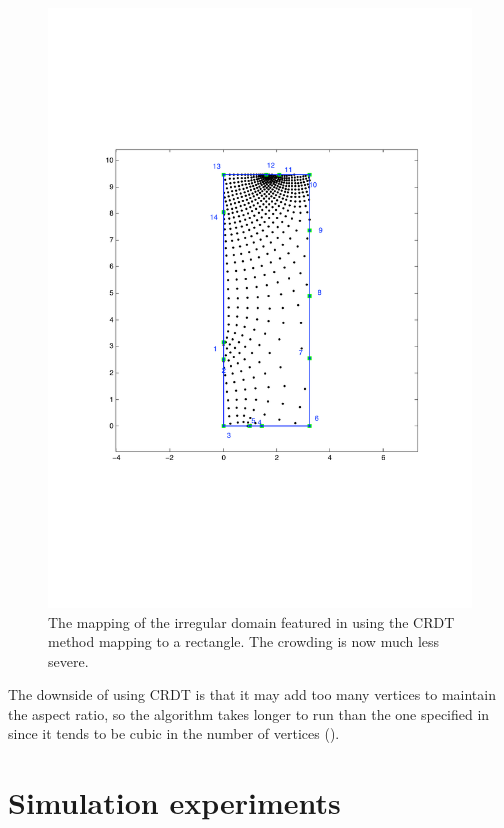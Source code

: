 \begin{figure} [tbp]
\centering
\includegraphics[scale=0.5]{sc/figs/irregular-fixed-crdt.pdf}
\caption{The mapping of the irregular domain featured in  using the CRDT method mapping to a rectangle. The crowding is now much less severe.}
\label{uncrowdeddisk}
\end{figure}

The downside of using CRDT is that it may add too many vertices to maintain the aspect ratio, so the algorithm takes longer to run than the one specified in  since it tends to be cubic in the number of vertices (\cite{driscoll05}). 

\section{Simulation experiments}

